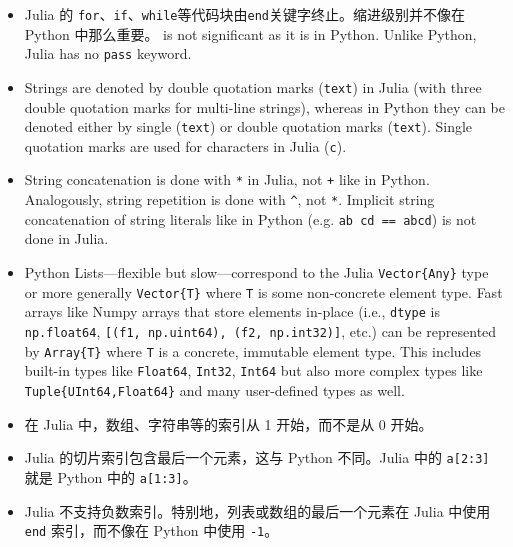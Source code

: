 \begin{itemize}
\item Julia 的 \texttt{for}、\texttt{if}、\texttt{while}等代码块由\texttt{end}关键字终止。缩进级别并不像在 Python 中那么重要。 is not significant as it is in Python. Unlike Python, Julia has no \texttt{pass} keyword.


\item Strings are denoted by double quotation marks (\texttt{{\textquotedbl}text{\textquotedbl}}) in Julia (with three double quotation marks for multi-line strings), whereas in Python they can be denoted either by single (\texttt{{\textquotesingle}text{\textquotesingle}}) or double quotation marks (\texttt{{\textquotedbl}text{\textquotedbl}}). Single quotation marks are used for characters in Julia (\texttt{{\textquotesingle}c{\textquotesingle}}).


\item String concatenation is done with \texttt{*} in Julia, not \texttt{+} like in Python. Analogously, string repetition is done with \texttt{{\textasciicircum}}, not \texttt{*}. Implicit string concatenation of string literals like in Python (e.g. \texttt{{\textquotesingle}ab{\textquotesingle} {\textquotesingle}cd{\textquotesingle} == {\textquotesingle}abcd{\textquotesingle}}) is not done in Julia.


\item Python Lists—flexible but slow—correspond to the Julia \texttt{Vector\{Any\}} type or more generally \texttt{Vector\{T\}} where \texttt{T} is some non-concrete element type. {\textquotedbl}Fast{\textquotedbl} arrays like Numpy arrays that store elements in-place (i.e., \texttt{dtype} is \texttt{np.float64}, \texttt{[({\textquotesingle}f1{\textquotesingle}, np.uint64), ({\textquotesingle}f2{\textquotesingle}, np.int32)]}, etc.) can be represented by \texttt{Array\{T\}} where \texttt{T} is a concrete, immutable element type. This includes built-in types like \texttt{Float64}, \texttt{Int32}, \texttt{Int64} but also more complex types like \texttt{Tuple\{UInt64,Float64\}} and many user-defined types as well.


\item 在 Julia 中，数组、字符串等的索引从 1 开始，而不是从 0 开始。


\item Julia 的切片索引包含最后一个元素，这与 Python 不同。Julia 中的 \texttt{a[2:3]} 就是 Python 中的 \texttt{a[1:3]}。


\item Julia 不支持负数索引。特别地，列表或数组的最后一个元素在 Julia 中使用 \texttt{end} 索引，而不像在 Python 中使用 \texttt{-1}。



\end{itemize}
